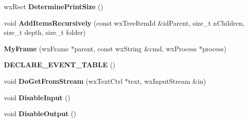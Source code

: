 \begin{DoxyCompactItemize}
\item 
\hypertarget{class_my_frame_a0a0c96d1c2ed63e1ed5ec760c264abd6}{wx\+Rect {\bfseries Determine\+Print\+Size} ()}\label{class_my_frame_a0a0c96d1c2ed63e1ed5ec760c264abd6}

\item 
\hypertarget{class_my_frame_af383f88851a6e4e47917a2f10abd0be3}{void {\bfseries Add\+Items\+Recursively} (const wx\+Tree\+Item\+Id \&id\+Parent, size\+\_\+t n\+Children, size\+\_\+t depth, size\+\_\+t folder)}\label{class_my_frame_af383f88851a6e4e47917a2f10abd0be3}

\item 
\hypertarget{class_my_frame_a994da93a143e19df0856168d785a471d}{{\bfseries My\+Frame} (wx\+Frame $\ast$parent, const wx\+String \&cmd, wx\+Process $\ast$process)}\label{class_my_frame_a994da93a143e19df0856168d785a471d}

\item 
\hypertarget{class_my_frame_a4e732ef446e650ed89ed7eb370bbedb4}{{\bfseries D\+E\+C\+L\+A\+R\+E\+\_\+\+E\+V\+E\+N\+T\+\_\+\+T\+A\+B\+L\+E} ()}\label{class_my_frame_a4e732ef446e650ed89ed7eb370bbedb4}

\item 
\hypertarget{class_my_frame_aa72c1011d890ebb970c10981d640b856}{void {\bfseries Do\+Get\+From\+Stream} (wx\+Text\+Ctrl $\ast$text, wx\+Input\+Stream \&in)}\label{class_my_frame_aa72c1011d890ebb970c10981d640b856}

\item 
\hypertarget{class_my_frame_a8d7783da2d823e4148d0517b74f90bad}{void {\bfseries Disable\+Input} ()}\label{class_my_frame_a8d7783da2d823e4148d0517b74f90bad}

\item 
\hypertarget{class_my_frame_a0ace815e204e10eacf8d60523668c7f9}{void {\bfseries Disable\+Output} ()}\label{class_my_frame_a0ace815e204e10eacf8d60523668c7f9}

\end{DoxyCompactItemize}
